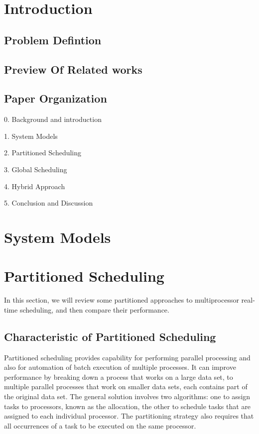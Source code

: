 \documentclass[preprint,12pt]{elsarticle}
\begin{document}
\linenumbers

\section{Introduction} \label{S:1}



\subsection{Problem Defintion}

\subsection{Preview Of Related works}

\subsection{Paper Organization}
0. Background and introduction

1. System Models

2. Partitioned Scheduling

3. Global Scheduling

4. Hybrid Approach

5. Conclusion and Discussion

\section{System Models} \label{S:2}
\subsection{}

\section{Partitioned Scheduling} \label{S:3}
In this section, we will review some partitioned approaches to multiprocessor real-time scheduling, and then compare their performance.
\subsection{Characteristic of Partitioned Scheduling}
Partitioned scheduling provides capability for performing parallel processing and also for automation of batch execution of multiple processes. It can improve performance by breaking down a process that works on a large data set, to multiple parallel processes that work on smaller data sets, each contains part of the original data set. The general solution involves two algorithms: one to assign tasks to processors, known as the allocation, the other to schedule tasks that are assigned to each individual processor. The partitioning strategy also requires that all occurrences of a task to be executed on the same processor.
\end{document}
